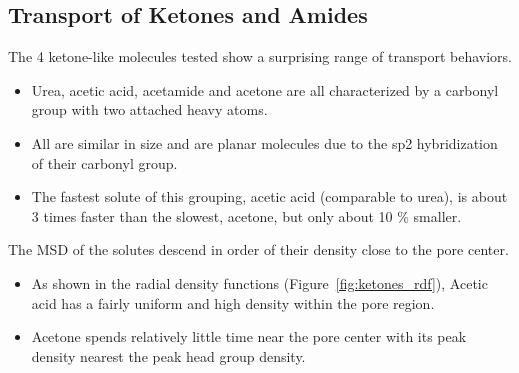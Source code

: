 \documentclass{article}
\begin{document}
  
  

  \subsection*{Transport of Ketones and Amides}
  
  The 4 ketone-like molecules tested show a surprising range of transport behaviors.
  \begin{itemize}
    \item Urea, acetic acid, acetamide and acetone are all characterized by a carbonyl group
    with two attached heavy atoms. 
    \item All are similar in size and are planar molecules due to the sp2 hybridization of
    their carbonyl group.
    \item The fastest solute of this grouping, acetic acid (comparable to urea), is about
    3 times faster than the slowest, acetone, but only about 10 \% smaller.
  \end{itemize}
  
  \noindent The MSD of the solutes descend in order of their density close to the pore center.
  \begin{itemize}
    \item As shown in the radial density functions (Figure~\ref{fig:ketones_rdf}), 
    Acetic acid has a fairly uniform and high density within the pore region.
    \item Acetone spends relatively little time near the pore center with its
    peak density nearest the peak head group density.
  \end{itemize}
  
\end{document}
